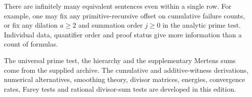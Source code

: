 There are infinitely many equivalent sentences even within a single row. For example, one may fix any primitive-recursive offset on cumulative failure counts, or fix any dilation $a\ge2$ and summation order $j\ge0$ in the analytic prime test. Individual data, quantifier order and proof status give more information than a count of formulas.

\medskip\noindent
The universal prime test, the hierarchy and the supplementary Mertens sums come from the supplied archive. The cumulative and additive-witness derivations, numerical alternatives, smoothing theory, divisor matrices, energies, convergence rates, Farey tests and rational divisor-sum tests are developed in this edition.
